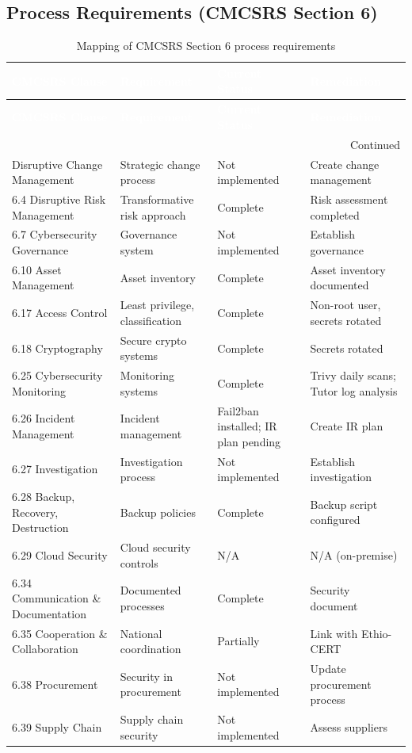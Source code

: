 \subsection{Process Requirements (CMCSRS Section 6)}
\begin{center}
\begin{longtable}{|p{}|p{}|p{}|p{}|}
\caption[CMCSRS Section 6 Mapping]{Mapping of CMCSRS Section 6 process requirements}
\label{tab:cmcsrs-sec6} \\
\hline
\rowcolor{mooveblue}
\textcolor{white}{\textbf{CMCSRS Clause}} & \textcolor{white}{\textbf{Requirement}} & \textcolor{white}{\textbf{Current Status}} & \textcolor{white}{\textbf{Remediation}} \\
\hline
\endfirsthead
\hline
\rowcolor{mooveblue}
\textcolor{white}{\textbf{CMCSRS Clause}} & \textcolor{white}{\textbf{Requirement}} & \textcolor{white}{\textbf{Current Status}} & \textcolor{white}{\textbf{Remediation}} \\
\hline
\endhead
\hline
\multicolumn{4}{|r|}{Continued} \\
\hline
\endfoot
\hline
\endlastfoot
6.3 Disruptive Change Management & Strategic change process & Not implemented & Create change management \\
6.4 Disruptive Risk Management & Transformative risk approach & Complete & Risk assessment completed \\
6.7 Cybersecurity Governance & Governance system & Not implemented & Establish governance \\
6.10 Asset Management & Asset inventory & Complete & Asset inventory documented \\
6.17 Access Control & Least privilege, classification & Complete & Non-root user, secrets rotated \\
6.18 Cryptography & Secure crypto systems & Complete & Secrets rotated \\
6.25 Cybersecurity Monitoring & Monitoring systems & Complete & Trivy daily scans; Tutor log analysis \\
6.26 Incident Management & Incident management & Fail2ban installed; IR plan pending & Create IR plan \\
6.27 Investigation & Investigation process & Not implemented & Establish investigation \\
6.28 Backup, Recovery, Destruction & Backup policies & Complete & Backup script configured \\
6.29 Cloud Security & Cloud security controls & N/A & N/A (on-premise) \\
6.34 Communication \& Documentation & Documented processes & Complete & Security document \\
6.35 Cooperation \& Collaboration & National coordination & Partially & Link with Ethio-CERT \\
6.38 Procurement & Security in procurement & Not implemented & Update procurement process \\
6.39 Supply Chain & Supply chain security & Not implemented & Assess suppliers \\
\hline
\end{longtable}
\end{center}

